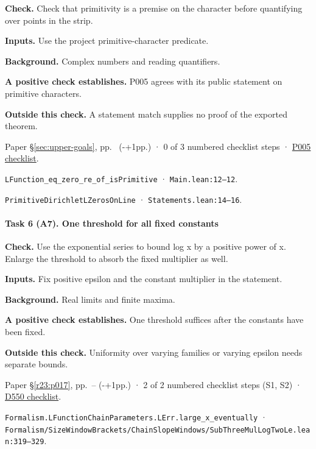\textbf{Check.} Check that primitivity is a premise on the character before quantifying over points in the strip.

\textbf{Inputs.} Use the project primitive-character predicate.

\textbf{Background.} Complex numbers and reading quantifiers.

\textbf{A positive check establishes.} P005 agrees with its public statement on primitive characters.

\textbf{Outside this check.} A statement match supplies no proof of the exported theorem.

Paper \S\ref{sec:upper-goals}, pp.\ \pageref{pn:P005} (\number\numexpr{}-+1\relax pp.) · 0 of 3 numbered checklist steps · \href{https://github.com/GunheeC/rh-lean-verification-atlas/blob/v0.1.0/units/P005.check.md}{P005 checklist}.

\nolinkurl{LFunction_eq_zero_re_of_isPrimitive} · \nolinkurl{Main.lean:12–12}.

\nolinkurl{PrimitiveDirichletLZerosOnLine} · \nolinkurl{Statements.lean:14–16}.

\paragraph{Task 6 (A7). One threshold for all fixed constants}\label{v7:task-6}

\textbf{Check.} Use the exponential series to bound log x by a positive power of x. Enlarge the threshold to absorb the fixed multiplier as well.

\textbf{Inputs.} Fix positive epsilon and the constant multiplier in the statement.

\textbf{Background.} Real limits and finite maxima.

\textbf{A positive check establishes.} One threshold suffices after the constants have been fixed.

\textbf{Outside this check.} Uniformity over varying families or varying epsilon needs separate bounds.

Paper \S\ref{r23:p017}, pp.\ \pageref{r24:d550}--\pageref{v5:d550-end} (\number\numexpr{}-+1\relax pp.) · 2 of 2 numbered checklist steps (S1, S2) · \href{https://github.com/GunheeC/rh-lean-verification-atlas/blob/v0.1.0/units/D550.check.md}{D550 checklist}.

\nolinkurl{Formalism.LFunctionChainParameters.LErr.large_x_eventually} · \nolinkurl{Formalism/SizeWindowBrackets/ChainSlopeWindows/SubThreeMulLogTwoLe.lean:319–329}.

